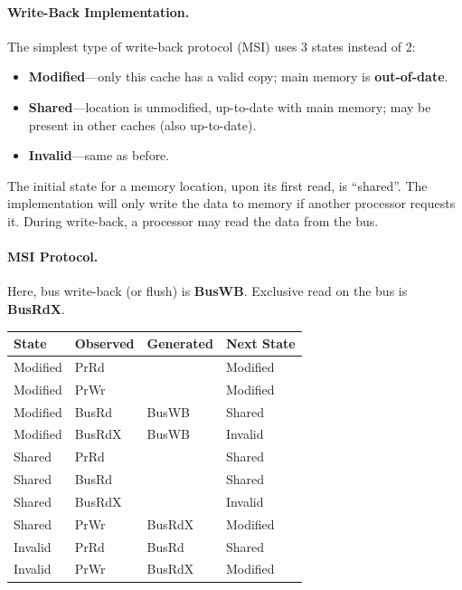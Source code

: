 \paragraph{Write-Back Implementation.}
     The simplest type of write-back protocol (MSI) uses 3 states instead of 2:
      \begin{itemize}
        \item {\bf Modified}---only this cache has a valid copy; 
          main memory is {\bf out-of-date}.
        \item {\bf Shared}---location is unmodified, 
           up-to-date with main
          memory; 
          \quad may be present in other caches (also up-to-date).
        \item {\bf Invalid}---same as before.
      \end{itemize}
      
The initial state for a memory location, upon its first read, is ``shared''.
The implementation will only write the data to memory if another
processor requests it.
During write-back, a processor may read the data from the bus.

\paragraph{MSI Protocol.} Here, bus write-back (or flush) is {\bf BusWB}.
Exclusive read on the bus is {\bf BusRdX}.

\begin{center}
    \begin{tabular}{l|l|l|l}
      {\bf State} & {\bf Observed} & {\bf Generated} & {\bf Next State}\\ \hline
      Modified   & PrRd   &        & Modified\\
      Modified   & PrWr   &        & Modified\\
      Modified   & BusRd  & BusWB  & Shared\\
      Modified   & BusRdX & BusWB  & Invalid\\
      Shared     & PrRd   &        & Shared\\
      Shared     & BusRd  &        & Shared\\
      Shared     & BusRdX &        & Invalid\\
      Shared     & PrWr   & BusRdX & Modified\\
      Invalid    & PrRd   & BusRd  & Shared\\
      Invalid    & PrWr   & BusRdX & Modified\\
    \end{tabular}
\end{center}

